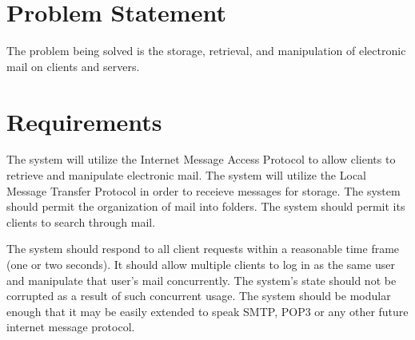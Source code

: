 \documentclass[a4paper,12pt]{article}
\begin{document}

\section*{Problem Statement}

The problem being solved is the storage, retrieval, and manipulation of electronic mail on clients and servers.

\section*{Requirements}

The system will utilize the Internet Message Access Protocol to allow clients to retrieve and manipulate electronic mail. The system will utilize the Local Message Transfer Protocol in order to receieve messages for storage. The system should permit the organization of mail into folders. The system should permit its clients to search through mail.

The system should respond to all client requests within a reasonable time frame (one or two seconds). It should allow multiple clients to log in as the same user and manipulate that user's mail concurrently. The system's state should not be corrupted as a result of such concurrent usage. The system should be modular enough that it may be easily extended to speak SMTP, POP3 or any other future internet message protocol.
\end{document}

